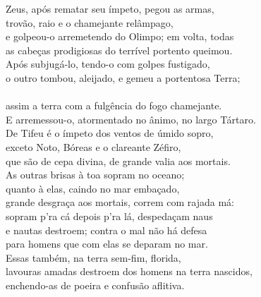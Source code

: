 \begin{pages}
\begin{Rightside}
\quad{}Zeus, após rematar seu ímpeto, pegou as armas,\\
trovão, raio e o chamejante relâmpago,\\
e golpeou-o arremetendo do Olimpo; em volta, todas \\
as cabeças prodigiosas do terrível portento queimou.\\
Após subjugá-lo, tendo-o com golpes fustigado,\\
o outro tombou, aleijado, e gemeu a portentosa Terra;\\
\\
assim  a terra com a fulgência do fogo chamejante.\\
E arremessou-o, atormentado no ânimo, no largo Tártaro.\\

\quad{}De Tifeu é o ímpeto dos ventos de úmido sopro,\\
exceto Noto, Bóreas e o clareante Zéfiro, \\
que são de cepa divina, de grande valia aos mortais.\\
As outras brisas à toa sopram no oceano;\\
quanto à elas, caindo no mar embaçado,\\
grande desgraça aos mortais, correm com rajada má:\\
sopram p'ra cá depois p'ra lá, despedaçam naus \\
e nautas destroem; contra o mal não há defesa\\
para homens que com elas se deparam no mar.\\
Essas também, na terra sem-fim, florida,\\
lavouras amadas destroem dos homens na terra nascidos,\\
enchendo-as de poeira e confusão aflitiva. \\[5pt]


\end{Rightside}
\end{pages}
